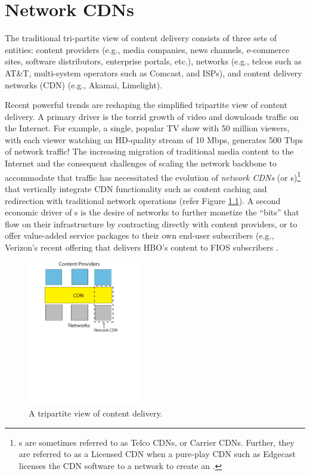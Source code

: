 \chapter{Network CDNs}
\label{ch:ncdn}


The traditional tri-partite view of content delivery consists of three sets of entities: content providers (e.g., media companies, news channels, e-commerce sites, software distributors, enterprise portals, etc.), networks (e.g., telcos such as AT\&T, multi-system operators such as Comcast, and  ISPs), and content delivery networks (CDN) (e.g., Akamai, Limelight). 

Recent powerful trends are reshaping the simplified tripartite view of content delivery. A primary driver is the torrid growth of video \cite{nielsen-video-growth,cisco-videogrowth} and downloads traffic on the Internet. For example, a single, popular TV show with 50 million viewers, with each viewer watching an HD-quality stream of 10 Mbps, generates 500 Tbps of network traffic! The increasing migration of traditional media content to the Internet and the consequent challenges of scaling the network backbone to accommodate that traffic has necessitated the evolution of {\em network CDNs} (or \ncp s)\footnote{\ncp s are sometimes referred to as Telco CDNs, or Carrier CDNs. Further, they are referred to as a Licensed CDN when a pure-play CDN such as Edgecast\cite{edgecast} licenses the CDN software to a network to create an \ncp.} that vertically integrate CDN functionality such as content caching and redirection with traditional network operations \cite{hpcdn,telcowhitepaper,level3-cdn,att-cdn,verizon-cdn} (refer Figure \ref{fig:networkCDN}). A second economic driver of \ncp s is the desire of networks to further monetize the ``bits'' that flow on their infrastructure by contracting directly with content providers, or to offer value-added service packages to their own end-user subscribers  (e.g., Verizon's recent offering that delivers HBO's content to FIOS subscribers  \cite{fios}.


\begin{figure}
\centerline{\includegraphics[height=2.5in]{ncdnpaper/NetworkCDN}}
\vspace*{-1.35in}
\caption{A tripartite view of content delivery.}
\vspace*{-0.25in}
\label{fig:networkCDN}
\end{figure}



